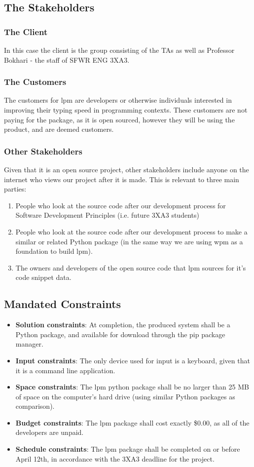 \documentclass[12pt, titlepage]{article}
\begin{document}
\subsection{The Stakeholders}
\subsubsection{The Client}
In this case the client is the group consisting of the TAs as well as Professor Bokhari - the staff of SFWR ENG 3XA3.
\subsubsection{The Customers}
The customers for lpm are developers or otherwise individuals interested in improving their typing speed in programming contexts. These customers are not paying for the package, as it is open sourced, however they will be using the product, and are deemed customers.
\subsubsection{Other Stakeholders}
Given that it is an open source project, other stakeholders include anyone on the internet who views our project after it is made. This is relevant to three main parties:
\begin{enumerate}
    \item People who look at the source code after our development process for Software Development Principles (i.e. future 3XA3 students)
    \item People who look at the source code after our development process to make a similar or related Python package (in the same way we are using wpm as a foundation to build lpm).
    \item The owners and developers of the open source code that lpm sources for it's code snippet data.
\end{enumerate}
\subsection{Mandated Constraints}
\begin{itemize}
    \item \textbf{Solution constraints}: At completion, the produced system shall be a Python package, and available for download through the pip package manager.
    \item \textbf{Input constraints}: The only device used for input is a keyboard, given that it is a command line application.
    \item \textbf{Space constraints}: The lpm python package shall be no larger than 25 MB of space on the computer's hard drive (using similar Python packages as comparison).
    \item \textbf{Budget constraints}: The lpm package shall cost exactly \$0.00, as all of the developers are unpaid.
    \item \textbf{Schedule constraints}: The lpm package shall be completed on or before April 12th, in accordance with the 3XA3 deadline for the project.
\end{itemize}
\end{document}
